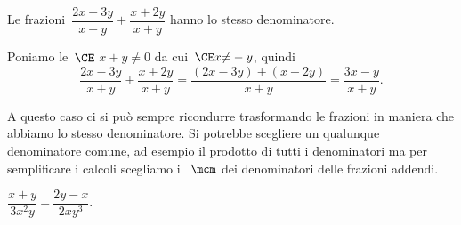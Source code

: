 \begin{exrig}
 \begin{esempio}
Le frazioni~$\dfrac{2x-3y}{x+y}+\dfrac{x+2y}{x+y}$ hanno lo stesso denominatore.

Poniamo le~$\CE$ $x + y{\neq}0$ da cui~$\CE x{\neq}-y$, quindi
\begin{equation*}
\frac{2x-3y}{x+y}+\frac{x+2y}{x+y}=\frac{(2x-3y)+(x+2y)}{x+y}=\frac{3x-y}{x+y}.
\end{equation*}
 \end{esempio}
\osservazione A questo caso ci si può sempre ricondurre trasformando le frazioni in maniera che abbiamo lo stesso denominatore. Si potrebbe scegliere un qualunque denominatore comune,
ad esempio il prodotto di tutti i denominatori ma per semplificare i calcoli scegliamo il~$\mcm$ dei denominatori delle frazioni addendi.

 \begin{esempio}
$\dfrac{x+y}{3x^{2}y}-\dfrac{2y-x}{2xy^{3}}$.


\end{esempio}
\end{exrig}

